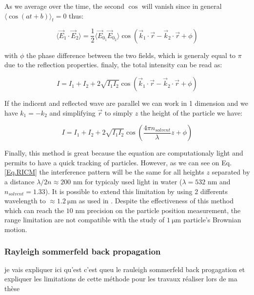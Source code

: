 As we average over the time, the second $\cos$ will vanish since in general $\langle \cos(at + b) \rangle_ t = 0$ thus:

\begin{equation}
	\langle \vec{E}_1 \cdot \vec{E}_2 \rangle = \frac{1}{2} \langle  \vec{E}_{0_1}  \vec{E}_{0_2} \rangle
	\cos 
	\left(
	\vec{k}_1 \cdot \vec{r} - \vec{k}_2 \cdot \vec{r} + \phi	
	\right)	
\end{equation}

with $\phi$ the phase difference between the two fields, which is generaly equal to $\pi$ due to the reflection properties.  finaly, the total intensity can be read as:


\begin{equation}
	I = I_1 + I_2 + 2 \sqrt{I_1 I_2} 
	\cos 
	\left(
	\vec{k}_1 \cdot \vec{r} - \vec{k}_2 \cdot \vec{r} + \phi	
	\right)
\end{equation}

If the indicent and reflected wave are parallel we can work in 1 dimension and we have $k_1 = - k_2$ and simplifying $	\vec{r} $ to simply $z$ the height of the particle we have:


\begin{equation}
	I = I_1 + I_2 + 2 \sqrt{I_1 I_2} 
	\cos 
	\left(
	\frac{4 \pi n_{solvent}}{\lambda} z + \phi	
	\right)
	\label{Eq.RICM}
\end{equation}

Finally, this method is great because the equation are computationaly light and permits to have a quick tracking of particles. However, as we can see on Eq.\ref{Eq.RICM} the interference pattern will be the same for all heights $z$ separated by a distance $\lambda / 2n \approx 200 $ nm for typicaly used light in water ($\lambda = 532$ nm and $n_{solvent} = 1.33$). It is possible to extend this limitation by using 2 differents wavelength to $\approx 1.2 ~ \mathrm{\mu m}$ as used in \cite{davies_elastohydrodynamic_2018}. Despite the effectiveness of this method which can reach the $10$ nm precision on the particle position measurement, the range limitation are not compatible with the study of $ 1 ~ \mathrm{\mu m}$ particle's Brownian motion.


\subsubsection{Rayleigh sommerfeld back propagation}
je vais expliquer ici qu'est c'est queu le rauleigh sommerfeld back progagation et expliquer les limitations de cette méthode pour les travaux réaliser lors de ma thèse
